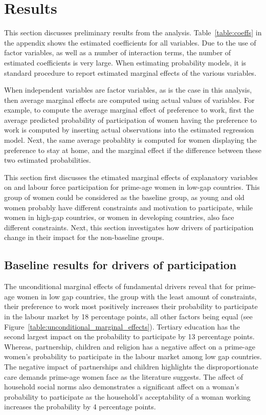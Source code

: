 \section{Results}\label{sec:results}
This section discusses preliminary results from the analysis. Table~\ref{table:coeffs} in the appendix shows the estimated coefficients for all variables. Due to the use of factor variables, as well as a number of interaction terms, the number of estimated coefficients is very large. When estimating probability models, it is standard procedure to report estimated marginal effects of the various variables.

When independent variables are factor variables, as is the case in this analysis, then average marginal effects are computed using actual values of variables. For example, to compute the average marginal effect of preference to work, first the average predicted probability of participation of women having the preference to work is computed by inserting actual observations into the estimated regression model. Next, the same average probablity is computed for women displaying the preference to stay at home, and the marginal effect if the difference between these two estimated probabilities.

This section first discusses the etimated marginal effects of explanatory variables on and labour force participation for prime-age women in low-gap countries. This group of women could be considered as the baseline group, as young and old women probably have different constraints and motivation to participate, while women in high-gap countries, or women in developing countries, also face different constraints. Next, this section investigates how drivers of participation change in their impact for the non-baseline groups.

\subsection{Baseline results for drivers of participation}
The unconditional marginal effects of fundamental drivers reveal that for prime-age women in low gap countries, the group with the least amount of constraints, their preference to work most positively increases their probability to participate in the labour market by 18 percentage points, all other factors being equal (see Figure~\ref{table:unconditional_marginal_effects}). Tertiary education has the second largest impact on the probability to participate by 13 percentage points. Whereas, partnership, children and religion has a negative affect on a prime-age women's probability to participate in the labour market among low gap countries. The negative impact of partnerships and children highlights the disproportionate care demands prime-age women face as the literature suggests. The affect of household social norms also demonstrates a significant affect on a woman's probability to participate as the household's acceptability of a woman working increases the probability by 4 percentage points. 

